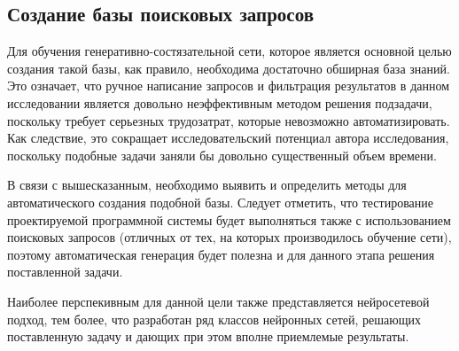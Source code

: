 \subsection{Создание базы поисковых запросов}
Для обучения генеративно-состязательной сети, которое является основной целью  создания такой базы, как правило,
необходима достаточно обширная база знаний. Это означает, что ручное написание запросов и фильтрация результатов
в данном исследовании является довольно неэффективным методом решения подзадачи, поскольку требует серьезных
трудозатрат, которые невозможно автоматизировать. Как следствие, это сокращает исследовательский потенциал автора
исследования, поскольку подобные задачи заняли бы довольно существенный объем времени.

В связи с вышесказанным, необходимо выявить и определить методы для автоматического создания подобной базы.
Следует отметить, что тестирование проектируемой программной системы будет выполняться также с использованием 
поисковых запросов (отличных от тех, на которых производилось обучение сети), поэтому автоматическая генерация
будет полезна и для данного этапа решения поставленной задачи.

Наиболее перспекивным для данной цели также представляется нейросетевой подход, тем более, что разработан ряд
классов нейронных сетей, решающих поставленную задачу и дающих при этом вполне приемлемые результаты.